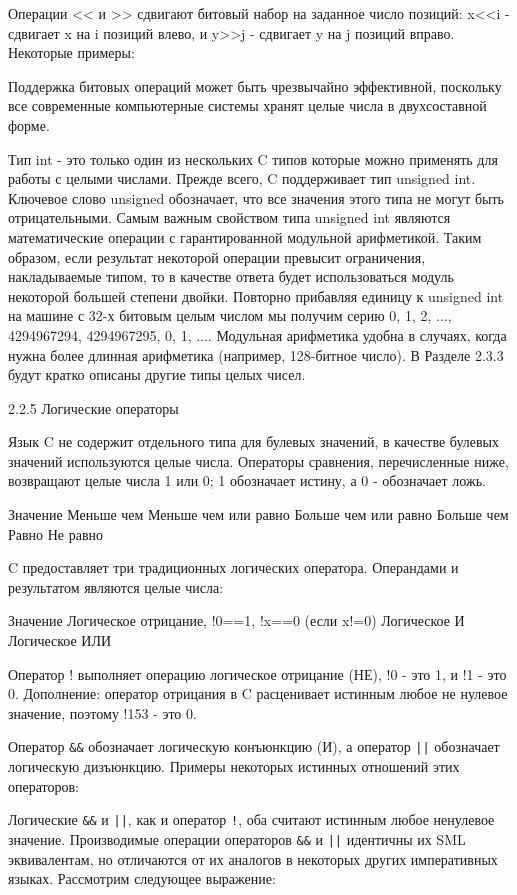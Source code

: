 Операции << и >> сдвигают битовый набор на заданное число позиций: x<<i - сдвигает x на i позиций влево, и y>>j - сдвигает y на j позиций вправо. Некоторые примеры:

Поддержка битовых операций может быть чрезвычайно эффективной, поскольку все современные компьютерные системы хранят целые числа в двухсоставной форме.

Тип int - это только один из нескольких C типов которые можно применять для работы с целыми числами. Прежде всего, C поддерживает тип unsigned int. Ключевое слово unsigned обозначает, что все значения этого типа не могут быть отрицательными. Самым важным свойством типа unsigned int являются математические операции с гарантированной модульной арифметикой. Таким образом, если результат некоторой операции превысит ограничения, накладываемые типом, то в качестве ответа будет использоваться модуль некоторой большей степени двойки. Повторно прибавляя единицу к unsigned int на машине с 32-х битовым целым числом мы получим серию 0, 1, 2, ..., 4294967294, 4294967295, 0, 1, .... Модульная арифметика удобна в случаях, когда нужна более длинная арифметика (например, 128-битное число). В Разделе 2.3.3 будут кратко описаны другие типы целых чисел.

2.2.5 Логические операторы

Язык C не содержит отдельного типа для булевых значений, в качестве булевых значений используются целые числа. Операторы сравнения, перечисленные ниже, возвращают целые числа 1 или 0; 1 обозначает истину, а 0 - обозначает ложь.

Значение
Меньше чем
Меньше чем или равно
Больше чем или равно
Больше чем
Равно
Не равно

C предоставляет три традиционных логических оператора. Операндами и результатом являются целые числа:

Значение
Логическое отрицание, !0==1, !x==0 (если x!=0)
Логическое И
Логическое ИЛИ

Оператор ! выполняет операцию логическое отрицание (НЕ), !0 - это 1, и !1 - это 0. Дополнение: оператор отрицания в C расценивает истинным любое не нулевое значение, поэтому !153 - это 0.

Оператор \lstinline|&&| обозначает логическую конъюнкцию (И), а оператор \lstinline!||! обозначает логическую дизъюнкцию. Примеры некоторых истинных отношений этих операторов:

Логические \lstinline|&&| и \lstinline!||!, как и оператор \lstinline|!|, оба считают истинным любое ненулевое значение. Производимые операции операторов \lstinline|&&| и \lstinline!||! идентичны их SML эквивалентам, но отличаются от их аналогов в некоторых других императивных языках. Рассмотрим следующее выражение:


